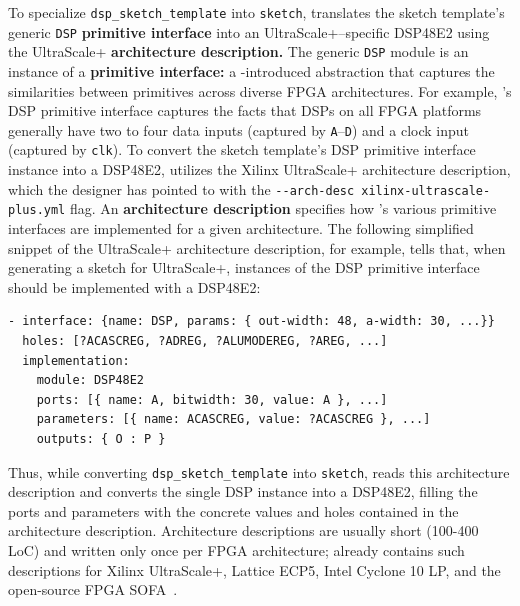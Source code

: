To specialize \texttt{dsp\_sketch\_template}
  into \texttt{sketch},
  \lr translates
  the sketch template's generic \texttt{DSP}
  \textbf{primitive interface}
  into an UltraScale+--specific
  DSP48E2
  using the UltraScale+
  \textbf{architecture description.}
The generic \texttt{DSP}
  module is an instance of a
  \textbf{primitive interface:} 
  a \lr-introduced abstraction that 
  captures the similarities
  between primitives across 
  diverse FPGA architectures.
For example, 
  \lr's DSP primitive interface
  captures the facts that
  DSPs on all FPGA platforms
  generally have two to four data inputs
  (captured by \texttt{A}--\texttt{D})
  and a clock input
  (captured by \texttt{clk}).
To convert the
  sketch template's
  DSP primitive interface instance
  into a DSP48E2,
  \lr utilizes the
  Xilinx UltraScale+ architecture description,
  which the designer has pointed to with the 
  \texttt{-{}-arch-desc xilinx-ultrascale-plus.yml}
  flag.
An \textbf{architecture description}
  specifies how \lr's various
  primitive interfaces
  are implemented for a given architecture.
The following simplified snippet of the UltraScale+
  architecture description, for example,
  tells \lr that,
  when generating a sketch for 
  UltraScale+,
  instances of the DSP
  primitive interface
  should be implemented with a DSP48E2:
\begin{verbatim}
- interface: {name: DSP, params: { out-width: 48, a-width: 30, ...}} 
  holes: [?ACASCREG, ?ADREG, ?ALUMODEREG, ?AREG, ...]
  implementation:
    module: DSP48E2
    ports: [{ name: A, bitwidth: 30, value: A }, ...]
    parameters: [{ name: ACASCREG, value: ?ACASCREG }, ...]
    outputs: { O : P }
\end{verbatim}
Thus, while converting
  \texttt{dsp\_sketch\_template}
  into
  \texttt{sketch},
  \lr reads this architecture description
  and converts the single DSP instance
  into a DSP48E2,
  filling the ports and parameters with the concrete values
  and holes
  contained in the architecture description.
Architecture descriptions
  are usually short (100-400 LoC)
  and
  written only once per FPGA architecture; 
  \lr already contains such descriptions
  for Xilinx UltraScale+,
  Lattice ECP5,
  Intel Cyclone 10 LP,
  and the open-source FPGA SOFA~\cite{sofa}.

